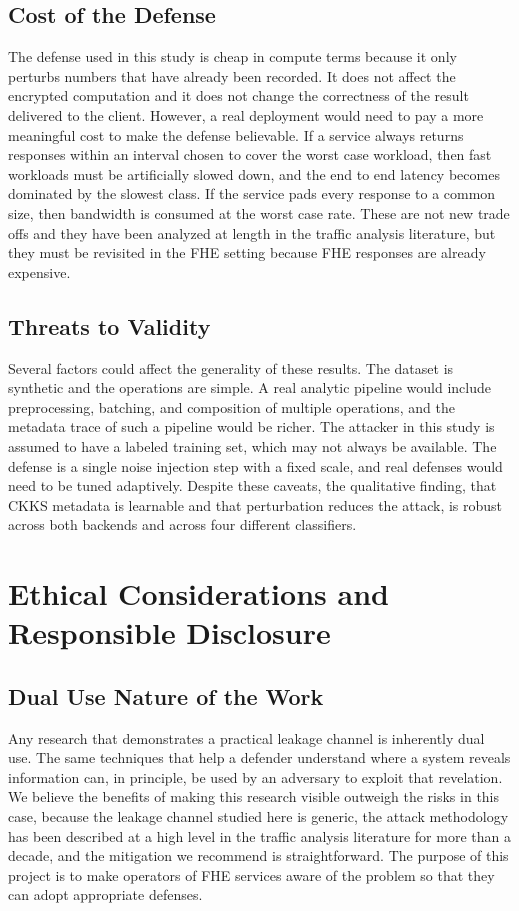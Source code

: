 \documentclass[12pt,a4paper]{article}
\begin{document}
\subsection{Cost of the Defense}
The defense used in this study is cheap in compute terms because it only perturbs numbers that have already been recorded. It does not affect the encrypted computation and it does not change the correctness of the result delivered to the client. However, a real deployment would need to pay a more meaningful cost to make the defense believable. If a service always returns responses within an interval chosen to cover the worst case workload, then fast workloads must be artificially slowed down, and the end to end latency becomes dominated by the slowest class. If the service pads every response to a common size, then bandwidth is consumed at the worst case rate. These are not new trade offs and they have been analyzed at length in the traffic analysis literature, but they must be revisited in the FHE setting because FHE responses are already expensive.

\subsection{Threats to Validity}
Several factors could affect the generality of these results. The dataset is synthetic and the operations are simple. A real analytic pipeline would include preprocessing, batching, and composition of multiple operations, and the metadata trace of such a pipeline would be richer. The attacker in this study is assumed to have a labeled training set, which may not always be available. The defense is a single noise injection step with a fixed scale, and real defenses would need to be tuned adaptively. Despite these caveats, the qualitative finding, that CKKS metadata is learnable and that perturbation reduces the attack, is robust across both backends and across four different classifiers.

\section{Ethical Considerations and Responsible Disclosure}

\subsection{Dual Use Nature of the Work}
Any research that demonstrates a practical leakage channel is inherently dual use. The same techniques that help a defender understand where a system reveals information can, in principle, be used by an adversary to exploit that revelation. We believe the benefits of making this research visible outweigh the risks in this case, because the leakage channel studied here is generic, the attack methodology has been described at a high level in the traffic analysis literature for more than a decade, and the mitigation we recommend is straightforward. The purpose of this project is to make operators of FHE services aware of the problem so that they can adopt appropriate defenses.
\end{document}
